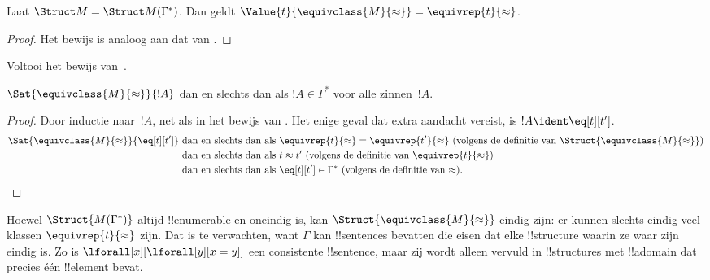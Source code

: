 \documentclass[../../../include/open-logic-section]{subfiles}
\begin{document}
\begin{lem} 
 Laat $\Struct M = \Struct M
 (\Gamma^*)$. Dan geldt $\Value{t}{\equivclass{M}{\approx}} = \equivrep{t}
 {\approx}$.
\end{lem}
\begin{proof} 
Het bewijs is analoog aan dat van .
\end{proof}

\begin{prob}
Voltooi het bewijs van~.
\end{prob}

\begin{lem}
$\Sat{\equivclass{M}{\approx}}{!A}$ dan en slechts dan als
$!A \in \Gamma^*$ voor alle zinnen~$!A$.
\end{lem}

\begin{proof}
Door inductie naar~$!A$, net als in het bewijs van
. Het enige geval dat extra aandacht vereist, is
$!A \ident \eq[t][t']$.
\begin{align*}
\Sat{\equivclass{M}{\approx}}{\eq[t][t']} & \text{ dan en slechts dan als } \equivrep{t}{\approx} = \equivrep{t'}{\approx}
\text{ (volgens de definitie van $\Struct{\equivclass{M}{\approx}}$)}\\
& \text{ dan en slechts dan als } t \approx t' \text{ (volgens de definitie van $\equivrep{t}{\approx}$)}\\
& \text{ dan en slechts dan als } \eq[t][t'] \in \Gamma^* \text{ (volgens de definitie van $\approx$).}
\end{align*}
\end{proof}

\begin{digress}
Hoewel $\Struct{M(\Gamma^*)}$ altijd !!{enumerable} en oneindig is, kan
$\Struct{\equivclass{M}{\approx}}$ eindig zijn: er kunnen slechts eindig
veel klassen $\equivrep{t}{\approx}$ zijn. Dat is te verwachten, want
$\Gamma$ kan !!{sentence}s bevatten die eisen dat elke !!{structure}
waarin ze waar zijn eindig is. Zo is
$\lforall[x][\lforall[y][x = y]]$ een consistente !!{sentence}, maar zij
wordt alleen vervuld in !!{structure}s met !!a{domain} dat precies één
!!{element} bevat.
\end{digress}
\end{document}
